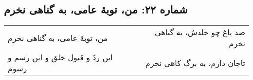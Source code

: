 \begin{center}
\section*{شماره ۲۲: من، توبۀ عامی، به گناهی نخرم}
\label{sec:022}
\begin{longtable}{l p{0.5cm} r}
من، توبهٔ عامی، به گناهی نخرم
&&
صد باغ چو خلدش، به گیاهی نخرم
\\
این ردّ و قبول خلق و این رسم و رسوم
&&
تاجان دارم، به برگ کاهی نخرم
\\
\end{longtable}
\end{center}
